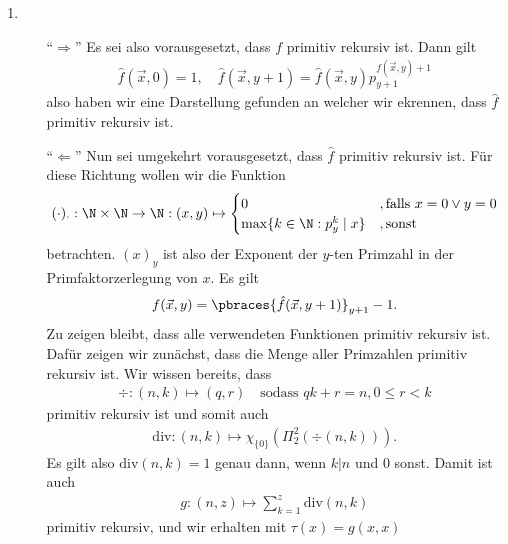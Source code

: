 \begin{solution}

\phantom{}
\begin{enumerate}[label = (\alph*)]
	\item
		\begin{enumerate}
			\item[``$\Rightarrow$''] Es sei also vorausgesetzt, dass $f$ primitiv rekursiv ist. Dann gilt
				\begin{align*}
				\hat{f}(\vec{x},0) = 1, \quad \hat{f}(\vec{x}, y + 1) = \hat{f}(\vec{x},y)p_{y+1}^{f(\vec{x}, y) + 1}
				\end{align*}
				also haben wir eine Darstellung gefunden an welcher wir ekrennen, dass $\hat{f}$ primitiv rekursiv ist.
			\item[``$\Leftarrow$''] Nun sei umgekehrt vorausgesetzt, dass $\hat{f}$ primitiv rekursiv ist. Für diese Richtung wollen wir die Funktion
				\begin{align*}
				(\cdot)_\cdot : \N \times \N \to \N : (x,y) \mapsto
				\begin{cases}
				0 &, \text{falls } x = 0 \lor y = 0 \\
				\max\{k \in \N : p_y^k \mid x \} &, \text{sonst}
				\end{cases}
				\end{align*}
				betrachten. $(x)_y$ ist also der Exponent der $y$-ten Primzahl in der Primfaktorzerlegung von $x$. Es gilt
				\begin{align*}
				f(\vec{x},y) = \pbraces{\hat{f}(\vec{x}, y + 1)}_{y + 1} - 1.
				\end{align*}
				Zu zeigen bleibt, dass alle verwendeten Funktionen primitiv rekursiv ist.
				Dafür zeigen wir zunächst, dass die Menge aller Primzahlen primitiv rekursiv
				ist. Wir wissen bereits, dass
				\begin{align*}
					\div: (n,k) \mapsto (q,r) \quad \text{sodass } qk + r = n, 0 \leq r < k
				\end{align*}
				primitiv rekursiv ist und somit auch
				\begin{align*}
					\mathrm{div}: (n,k) \mapsto \chi_{\{0\}}(\Pi_2^2(\div(n,k))).
				\end{align*}
				Es gilt also $\mathrm{div}(n,k) = 1$ genau dann, wenn $k | n$ und $0$ sonst.
				Damit ist auch
				\begin{align*}
					g: (n,z) \mapsto \sum_{k=1}^z \mathrm{div}(n,k)
				\end{align*}
				primitiv rekursiv, und wir erhalten mit $\tau(x) = g(x,x)$
				\begin{align*}

\end{align*}
\end{enumerate}
\end{enumerate}
\end{solution}
